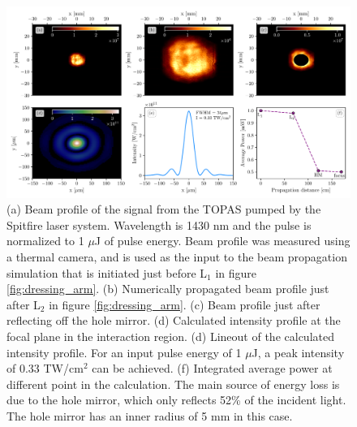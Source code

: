 \begin{figure}%
	\includegraphics[width=\textwidth]{figures/Beamline/pump_intensity_profiles_1430nm_1uj.pdf}
	\caption[Calculation of dressing intensity]{(a) Beam profile of the signal from the TOPAS pumped by the Spitfire laser system.  Wavelength is 1430 nm and the pulse is normalized to 1 $\mu$J of pulse energy.  Beam profile was measured using a thermal camera, and is used as the input to the beam propagation simulation that is initiated just before L$_1$ in figure \ref{fig:dressing_arm}. (b) Numerically propagated beam profile just after L$_2$ in figure \ref{fig:dressing_arm}. (c) Beam profile just after reflecting off the hole mirror.  (d) Calculated intensity profile at the focal plane in the interaction region. (d) Lineout of the calculated intensity profile.  For an input pulse energy of 1 $\mu$J, a peak intensity of 0.33 TW/cm$^2$ can be achieved.  (f) Integrated average power at different point in the calculation.  The main source of energy loss is due to the hole mirror, which only reflects 52\% of the incident light.  The hole mirror has an inner radius of 5 mm in this case.}
	\label{fig:dressing_intensity}
\end{figure}


